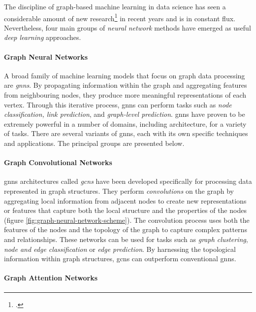 \documentclass[a4paper, 12pt]{report}
\begin{document}
The discipline of graph-based machine learning in data science has seen a considerable amount of new research\footcite{velivckovic2023everything} in recent years and is in constant flux. Nevertheless, four main groups of \textit{neural network} methods have emerged as useful \textit{deep learning} approaches.

\paragraph{Graph Neural Networks}\label{par:graph-neural-networks}

A broad family of machine learning models that focus on graph data processing are \textit{\acrfull{gnns}}. By propagating information within the graph and aggregating features from neighbouring nodes, they produce more meaningful representations of each vertex. Through this iterative process, \acrshort{gnns} can perform tasks such as \textit{node classification,} \textit{link prediction}, and \textit{graph-level prediction}. \acrshort{gnns} have proven to be extremely powerful in a number of domains, including architecture, for a variety of tasks. There are several variants of \acrshort{gnns}, each with its own specific techniques and applications. The principal groups are presented below.

\paragraph{Graph Convolutional Networks}\label{par:graph-convolutional-networks}

\acrshort{gnns} architectures called \textit{\acrfull{gcns}} have been developed specifically for processing data represented in graph structures. They perform \textit{\glspl{convolution}} on the graph by aggregating local information from adjacent nodes to create new representations or features that capture both the local structure and the properties of the nodes (figure \ref{fig:graph-neural-network-scheme}). The \gls{convolution} process uses both the features of the nodes and the topology of the graph to capture complex patterns and relationships. These networks can be used for tasks such as \textit{graph clustering}, \textit{node and edge classification} or \textit{edge prediction}. By harnessing the topological information within graph structures, \acrshort{gcns} can outperform conventional \acrshort{gnns}.

\paragraph{Graph Attention Networks}\label{par:graph-attention-networks}
\end{document}
